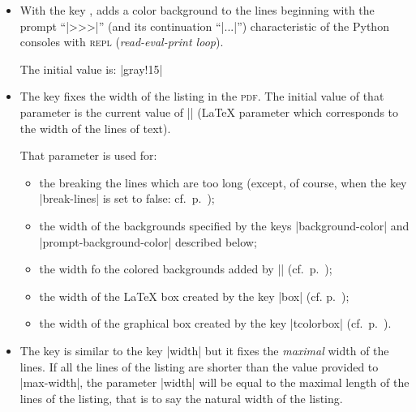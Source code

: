 \documentclass{article}
\begin{document}
\begin{itemize}
\nobreak
It's possible to use the key  to require rounded
corners for the colored panels drawn by the key |background-color| The initial
value of that is $0$~pt, which means that the corners are not rounded. If the
key |rounded-corners| is used, the extension  must be loaded because
those rounded corners are drawn by using . If  is not
loaded, an error will be raised at the first use of the key |rounded-corners|.

The default value of the key |rounded-corners| is $4$~pt.\footnote{This value is the
initial value of the \emph{rounded corners} of TikZ.}

\item {} With the key
,  adds a 
color background to the lines beginning with the prompt ``|>>>|'' (and its
continuation ``|...|'') characteristic of the Python consoles with
\textsc{repl} (\emph{read-eval-print loop}).

The initial value is: |gray!15|

\item {} \label{width} The key  fixes the width
of the listing in the \textsc{pdf}. The initial value of that parameter
is the current value of |\linewidth| (LaTeX parameter which corresponds to the
width of the lines of text).

That parameter is used for:
\begin{itemize}
\item the breaking the lines which are too long (except, of course, when the key
|break-lines| is set to false: cf.~p.~\pageref{line-breaks});
\item the width of the backgrounds specified by the keys |background-color| and
|prompt-background-color| described below;
\item the width fo the colored backgrounds added by |\rowcolor|
(cf.~p.~\pageref{rowcolor});
\item the width of the LaTeX box created by the key |box| (cf. p.~\pageref{box});
\item the width of the graphical box created by the key |tcolorbox|
(cf.~p.~\pageref{tcolorbox}).
\end{itemize}

\item {}

The key  is similar to the key |width| but it fixes the
\emph{maximal} width of the lines. If all the lines of the listing are shorter
than the value provided to |max-width|, the parameter |width| will be equal to
the maximal length of the lines of the listing, that is to say the natural width of
the listing.


\end{itemize}
\end{document}
